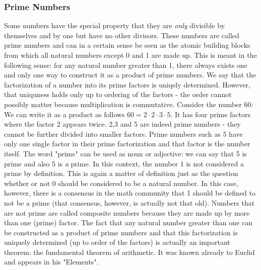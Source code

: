 \subsubsection{Prime Numbers}
Some numbers have the special property that they are \emph{only} divisible by themselves and by one but have no other divisors. These numbers are called prime numbers and can in a certain sense be seen as the atomic building blocks from which all natural numbers except 0 and 1 are made up. This is meant in the following sense: for any natural number greater than 1, there always exists one and only one way to construct it as a product of prime numbers. We say that the factorization of a number into its prime factors is uniqely determined. However, that uniquness holds only up to ordering of the factors - the order cannot possibly matter because multiplication is commutative. Consider the number 60: We can write it as a product as follows $60 = 2 \cdot 2 \cdot 3 \cdot 5$. It has four prime factors where the factor 2 appears twice. 2,3 and 5 are indeed prime numbers - they cannot be further divided into smaller factors. Prime numbers such as 5 have only one single factor in their prime factorization and that factor is the number itself. The word "prime" can be used as noun or adjective: we can say that 5 is prime and also 5 is \emph{a} prime. In this context, the number 1 is not considered a prime by definition. This is again a matter of definition just as the question whether or not 0 should be considered to be a natural number. In this case, however, there is a consensus in the math community that 1 should be defined to not be a prime (that consensus, however, is actually not that old). Numbers that are not prime are called composite numbers because they are made up by more than one (prime) factor. The fact that any natural number greater than one can be constructed as a product of prime numbers and that this factorization is uniquely determined (up to order of the factors) is actually an important theorem: the fundamental theorem of arithmetic. It was known already to Euclid and appears in his "Elements".

